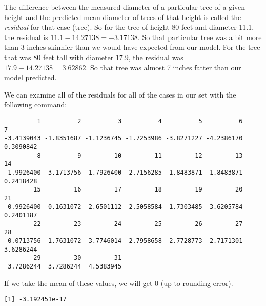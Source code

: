 \documentclass[
]{article}
\newenvironment{Shaded}{\begin{snugshade}}{\end{snugshade}}
\newcommand{\DecValTok}[1]{\textcolor[rgb]{0.00,0.00,0.81}{#1}}
\newcommand{\FunctionTok}[1]{\textcolor[rgb]{0.00,0.00,0.00}{#1}}
\newcommand{\NormalTok}[1]{#1}
\newcommand{\SpecialCharTok}[1]{\textcolor[rgb]{0.00,0.00,0.00}{#1}}
\begin{document}
The difference between the measured diameter of a particular tree of a
given height and the predicted mean diameter of trees of that height is
called the \emph{residual} for that case (tree). So for the tree of
height 80 feet and diameter 11.1, the residual is
\(11.1 - 14.27138 = -3.17138\). So that particular tree was a bit more
than 3 inches skinnier than we would have expected from our model. For
the tree that was 80 feet tall with diameter 17.9, the residual was
\(17.9 - 14.27138 = 3.62862\). So that tree was almost 7 inches fatter
than our model predicted.

We can examine all of the residuals for all of the cases in our set with
the following command:

\begin{Shaded}
\end{Shaded}

\begin{verbatim}
         1          2          3          4          5          6          7 
-3.4139043 -1.8351687 -1.1236745 -1.7253986 -3.8271227 -4.2386170  0.3090842 
         8          9         10         11         12         13         14 
-1.9926400 -3.1713756 -1.7926400 -2.7156285 -1.8483871 -1.8483871  0.2418428 
        15         16         17         18         19         20         21 
-0.9926400  0.1631072 -2.6501112 -2.5058584  1.7303485  3.6205784  0.2401187 
        22         23         24         25         26         27         28 
-0.0713756  1.7631072  3.7746014  2.7958658  2.7728773  2.7171301  3.6286244 
        29         30         31 
 3.7286244  3.7286244  4.5383945 
\end{verbatim}

If we take the mean of these values, we will get 0 (up to rounding
error).

\begin{Shaded}
\end{Shaded}

\begin{verbatim}
[1] -3.192451e-17
\end{verbatim}

\begin{Shaded}
\end{Shaded}
\end{document}
